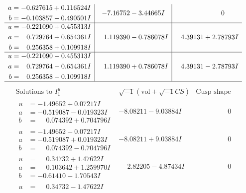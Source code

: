 \documentclass[1p]{elsarticle_modified}
\theoremstyle{definition}
\newcommand{\I}{\sqrt{-1}}
\begin{document}
$$\begin{array}{c|c|c}
\begin{aligned}
a &= -0.627615 + 0.116524 I \\
b &= -0.103857 - 0.490501 I\end{aligned}
 & -7.16752 - 3.44665 I & \phantom{-0.000000 } 0 \\ \hline\begin{aligned}
u &= -0.221090 + 0.455313 I \\
a &= \phantom{-}0.729764 + 0.654361 I \\
b &= \phantom{-}0.256358 + 0.109918 I\end{aligned}
 & \phantom{-}1.119390 - 0.786078 I & \phantom{-}4.39131 + 2.78793 I \\ \hline\begin{aligned}
u &= -0.221090 - 0.455313 I \\
a &= \phantom{-}0.729764 - 0.654361 I \\
b &= \phantom{-}0.256358 - 0.109918 I\end{aligned}
 & \phantom{-}1.119390 + 0.786078 I & \phantom{-}4.39131 - 2.78793 I\\
 \hline 
 \end{array}$$\newpage$$\begin{array}{c|c|c}  
\text{Solutions to }I^u_{1}& \I (\text{vol} + \sqrt{-1}CS) & \text{Cusp shape}\\
 \hline 
\begin{aligned}
u &= -1.49652 + 0.07217 I \\
a &= -0.519087 - 0.019323 I \\
b &= \phantom{-}0.074392 + 0.704796 I\end{aligned}
 & -8.08211 - 9.03884 I & \phantom{-0.000000 } 0 \\ \hline\begin{aligned}
u &= -1.49652 - 0.07217 I \\
a &= -0.519087 + 0.019323 I \\
b &= \phantom{-}0.074392 - 0.704796 I\end{aligned}
 & -8.08211 + 9.03884 I & \phantom{-0.000000 } 0 \\ \hline\begin{aligned}
u &= \phantom{-}0.34732 + 1.47622 I \\
a &= \phantom{-}0.103642 + 1.259970 I \\
b &= -0.61410 - 1.70543 I\end{aligned}
 & \phantom{-}2.82205 - 4.87434 I & \phantom{-0.000000 } 0 \\ \hline\begin{aligned}
u &= \phantom{-}0.34732 - 1.47622 I \\

\end{aligned}
\end{array}$$
\end{document}
